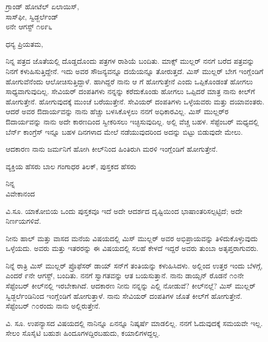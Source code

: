 \begin{flushright}
ಗ್ರಾಂಡ್ ಹೋಟೆಲ್ ಏಲಾಯಿಸ್,\\ಸಾಸ್‌ಫೀ, ಸ್ವಿಡ್ಜರ್ಲೆಂಡ್\\೮ನೇ ಆಗಸ್ಟ್ ೧೮೯೬
\end{flushright}

\noindent
ಧನ್ಯ ಪ್ರಿಯತಮ,

ನಿನ್ನ ಪತ್ರದ ಜೊತೆಯಲ್ಲಿ ದೊಡ್ಡದೊಂದು ಪತ್ರಗಳ ರಾಶಿಯೆ ಬಂದಿತು. ಮಾಕ್ಸ್ ಮುಲ್ಲರ್ ನನಗೆ ಬರೆದ ಪತ್ರವನ್ನು ನಿನಗೆ ಕಳುಹಿಸುತ್ತಿದ್ದೇನೆ. ಇದು ಅವರ ಸೌಜನ್ಯವನ್ನೂ ದಯೆಯನ್ನೂ ತೋರುತ್ತದೆ. ಮಿಸ್ ಮುಲ್ಲರ್ ಬೇಗ ಇಂಗ್ಲೆಂಡಿಗೆ ಹೋಗುವೆನೆಂದು ಆಲೋಚಿಸುತ್ತಿದ್ದಾಳೆ. ಹಾಗಿದ್ದರೆ ನಾನು ಆ  ಗೆ ಹೋಗುತ್ತೇನೆ ಎಂದು ಒಪ್ಪಿಕೊಂಡಂತೆ ಹೋಗಲು ಸಾಧ್ಯವಾಗುವುದಿಲ್ಲ. ಸೇವಿಯರ್ ದಂಪತಿಗಳು ನನ್ನನ್ನು ಕರೆದುಕೊಂಡು ಹೋಗಲು ಒಪ್ಪಿದರೆ ಮಾತ್ರ ನಾನು ಕೀಲ್‌ಗೆ ಹೋಗುತ್ತೇನೆ. ಹೋಗುವುದಕ್ಕೆ ಮುಂಚೆ ಬರೆಯುತ್ತೇನೆ. ಸೇವಿಯರ್ ದಂಪತಿಗಳು ಒಳ್ಳೆಯವರು ಮತ್ತು ದಯಾವಂತರು. ಆದರೆ ಅವರ ಔದಾರ್ಯವನ್ನು ನಾನು ಹೆಚ್ಚು ಬಳಸಿಕೊಳ್ಳಲು ನನಗೆ ಅಧಿಕಾರವಿಲ್ಲ. ಮಿಸ್ ಮುಲ್ಲರ್‌ರ ಔದಾರ್ಯವನ್ನು ನಾನು ಅದೇ ಕಾರಣದಿಂದ ಸ್ವೀಕರಿಸಲು ಇಚ್ಛಿಸುವುದಿಲ್ಲ. ಅಲ್ಲಿ ವೆಚ್ಚ ಬಹಳ. ಸೆಪ್ಟೆಂಬರ್ ಮಧ್ಯದಲ್ಲಿ ಬೆರ್ನ್ ಕಾಂಗ್ರೆಸ್ ಇನ್ನೂ ಬಹಳ ದಿನಗಳಾದ ಮೇಲೆ ನಡೆಯುವುದರಿಂದ ಅದನ್ನು ಬಿಟ್ಟು ಬಿಡುವುದೇ ಮೇಲು.

ಆದಕಾರಣ ನಾನು ಜರ್ಮನಿಗೆ ಹೋಗಿ ಕೀಲ್‌ನಿಂದ ಹಿಂತಿರುಗಿ ಮರಳಿ ಇಂಗ್ಲೆಂಡಿಗೆ ಹೋಗುತ್ತೇನೆ.

ವ್ಯಕ್ತಿಯ ಹೆಸರು ಬಾಲ ಗಂಗಾಧರ ತಿಲಕ್, ಪುಸ್ತಕದ ಹೆಸರು 

{\flushright
ನಿನ್ನ\\ವಿವೇಕಾನಂದ\par}

\vspace{0.1cm}

ವಿ.ಸೂ.\enginline{-} ಯಾಕೋಬಿಯ ಒಂದು ಪುಸ್ತಕವೂ ಇದೆ\enginline{-} ಅದೇ ಆದರ್ಶದ ದೃಷ್ಟಿಯಿಂದ ಭಾಷಾಂತರಿಸಲ್ಪಟ್ಟಿದೆ; ಅದೇ ನಿರ್ಣಯಗಳಿವೆ.

ನೀನು ಹಾಲ್ ಮತ್ತು ವಾಸದ ಮನೆಯ ವಿಷಯದಲ್ಲಿ ಮಿಸ್ ಮುಲ್ಲರ್ ಅವರ ಅಭಿಪ್ರಾಯವನ್ನು ತಿಳಿದುಕೊಳ್ಳುವುದು ಒಳ್ಳೆಯದು. ಅವರು ಮತ್ತು ಇತರರನ್ನು ಈ ವಿಷಯದಲ್ಲಿ ಸಲಹೆ ಕೇಳದೆ ಇದ್ದರೆ ಅವರು ತುಂಬಾ ಅತೃಪ್ತರಾಗುವರು.

ನಿನ್ನೆ ರಾತ್ರಿ ಮಿಸ್ ಮುಲ್ಲರ್ ಪ್ರೊಫೆಸರ್ ಡಾಯ್ ಸನ್‌ಗೆ ತಂತಿಯನ್ನು ಕಳುಹಿಸಿದಳು. ಅಲ್ಲಿಂದ ಉತ್ತರ ಇಂದು ಬೆಳಗ್ಗೆ, ಎಂದರೆ ೯ನೇ ಆಗಸ್ಟ್, ಬಂದಿತು. ನನಗೆ ಸ್ವಾಗತವನ್ನು ಆತ ಬಯಸುತ್ತಾನೆ. ನಾನು ಡಾಯ್ಸನ್ ರೊಡನೆ ೧೦ನೇ ಸೆಪ್ಟೆಂಬರ್ ಕೀಲ್‌ನಲ್ಲಿ ಇರಬೇಕಾಗಿದೆ. ಆದಕಾರಣ ನೀನು ನನ್ನನ್ನು ಎಲ್ಲಿ ನೋಡುವೆ? ಕೀಲ್‌ನಲ್ಲೆ? ಮಿಸ್ ಮುಲ್ಲರ್ ಸ್ವಿಡ್ಜರ್ಲೆಂಡಿನಿಂದ ಇಂಗ್ಲೆಂಡಿಗೆ ಹೋಗುತ್ತಾಳೆ. ನಾನು ಸೇವಿಯರ್ ದಂಪತಿಗಳ ಜೊತೆ ಕೀಲ್‌ಗೆ ಹೋಗುತ್ತೇನೆ. ಸೆಪ್ಟೆಂಬರ್ ೧೦ರಂದು ನಾನು ಅಲ್ಲಿರುತ್ತೇನೆ.

ವಿ. ಸೂ.\enginline{-} ಉಪನ್ಯಾಸದ ವಿಷಯದಲ್ಲಿ ನಾನಿನ್ನೂ ಏನನ್ನೂ ನಿಷ್ಕರ್ಷೆ ಮಾಡಲಿಲ್ಲ. ನನಗೆ ಓದುವುದಕ್ಕೆ ಸಮಯವೇ ಇಲ್ಲ. ಸೇಲಂ ಸೊಸೈಟಿ ಬಹುಶಃ ಹಿಂದೂಗಳದ್ದಿರಬಹುದು, ಕಯಾಲಿಗಳದ್ದಲ್ಲ.

